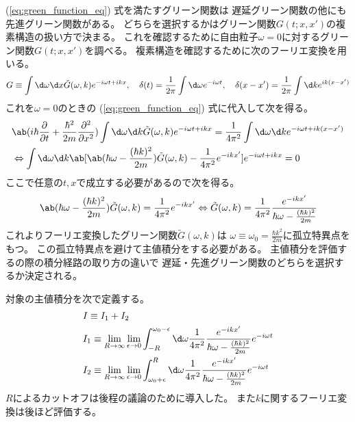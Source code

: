 (\ref{eq:green_function_eq}) 式を満たすグリーン関数は
遅延グリーン関数の他にも先進グリーン関数がある。
どちらを選択するかはグリーン関数$G(t;x,x')$の複素構造の扱い方で決まる。
これを確認するために自由粒子$\omega=0$に対するグリーン関数$G(t;x,x')$を調べる。
複素構造を確認するために次のフーリエ変換を用いる。
\begin{equation}
  \begin{split}
    G\equiv
    \int \d\omega\d x
    \tilde{G}(\omega,k)e^{-i\omega t+ikx},\quad
    \delta(t)=\frac{1}{2\pi}\int\d\omega e^{-i\omega t},\quad
    \delta(x-x')=\frac{1}{2\pi}\int\d k e^{ik(x-x')}
  \end{split}
\end{equation}
これを$\omega=0$のときの (\ref{eq:green_function_eq}) 式に代入して次を得る。
\begin{equation}
  \begin{split}
    &\ab(i\hbar\pdv{}{t}+\frac{\hbar^2}{2m}\pdv[order={2}]{}{x})
    \int \d\omega\d k
    \tilde{G}(\omega,k)e^{-i\omega t+ikx}
    =\frac{1}{4\pi^2}
    \int\d\omega\d k e^{-i\omega t+ik(x-x')} \\
    &\Leftrightarrow
    \int\d\omega\d k
    \ab[\ab(\hbar\omega-\frac{(\hbar k)^2}{2m})\tilde{G}(\omega,k)-\frac{1}{4\pi^2}e^{-ikx'}]
    e^{-i\omega t+ikx} = 0
  \end{split}
\end{equation}
ここで任意の$t,x$で成立する必要があるので次を得る。
\begin{equation}
  \begin{split}
    \ab(\hbar\omega-\frac{(\hbar k)^2}{2m})\tilde{G}(\omega,k)
    =\frac{1}{4\pi^2}e^{-ikx'}
    \Leftrightarrow
    \tilde{G}(\omega,k)
    =\frac{1}{4\pi^2}\frac{e^{-ikx'}}{\hbar\omega-\frac{(\hbar k)^2}{2m}}
  \end{split}
\end{equation}
これよりフーリエ変換したグリーン関数$\tilde{G}(\omega,k)$は
$\omega\equiv\omega_0=\frac{\hbar k^2}{2m}$に孤立特異点をもつ。
この孤立特異点を避けて主値積分をする必要がある。
主値積分を評価するの際の積分経路の取り方の違いで
遅延・先進グリーン関数のどちらを選択するか決定される。

対象の主値積分を次で定義する。
\begin{equation}
  \begin{split}
    &I\equiv I_1+I_2 \\
    &I_1\equiv
    \lim_{R\rightarrow\infty}
    \lim_{\epsilon\rightarrow0}
    \int_{-R}^{\omega_0-\epsilon}\d\omega
    \frac{1}{4\pi^2}\frac{e^{-ikx'}}{\hbar\omega-\frac{(\hbar k)^2}{2m}}
    e^{-i\omega t} \\
    &I_2\equiv
    \lim_{R\rightarrow\infty}
    \lim_{\epsilon\rightarrow0}
    \int_{\omega_0+\epsilon}^R\d\omega
    \frac{1}{4\pi^2}\frac{e^{-ikx'}}{\hbar\omega-\frac{(\hbar k)^2}{2m}}
    e^{-i\omega t}
  \end{split}
\end{equation}
$R$によるカットオフは後程の議論のために導入した。
また$k$に関するフーリエ変換は後ほど評価する。

